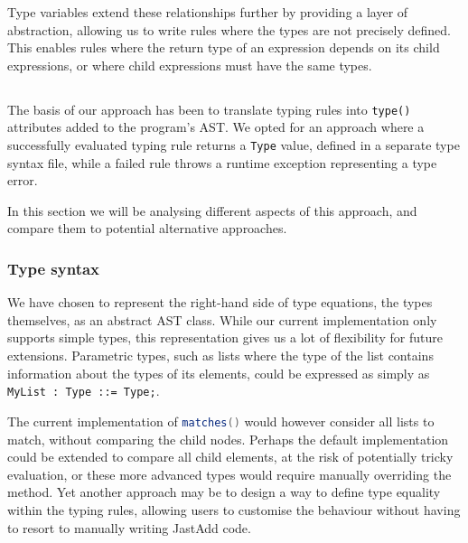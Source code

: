 \documentclass[nofilelist]{cslthse-msc}
\newcommand{\CR}[1]{\textcolor{green!60!black}{[\textbf{CR}:#1]}}
\begin{document}
Type variables extend these relationships further by providing a layer of abstraction, allowing us to write rules where the types are not precisely defined.
This enables rules where the return type of an expression depends on its child expressions, or where child expressions must have the same types.

%
%

\subsection{\rqtwo}
The basis of our approach has been to translate typing rules into \lstinline{type()} attributes added to the program's AST.
We opted for an approach where a successfully evaluated typing rule returns a \lstinline{Type} value, defined in a separate type syntax file, while a failed rule throws a runtime exception representing a type error.

In this section we will be analysing different aspects of this approach, and compare them to potential alternative approaches.

\subsubsection{Type syntax}
We have chosen to represent the right-hand side of type equations, the types themselves, as an abstract AST class.
While our current implementation only supports simple types, this representation gives us a lot of flexibility for future extensions.
Parametric types, such as lists where the type of the list contains information about the types of its elements, could be expressed as simply as \lstinline{MyList : Type ::= Type;}.

The current implementation of \lstinline[language=java]{matches()} would however consider all lists to match, without comparing the child nodes.
Perhaps the default implementation could be extended to compare all child elements, at the risk of potentially tricky evaluation, or these more advanced types would require manually overriding the method.
Yet another approach may be to design a way to define type equality within the typing rules, allowing users to customise the behaviour without having to resort to manually writing JastAdd code.
\end{document}
